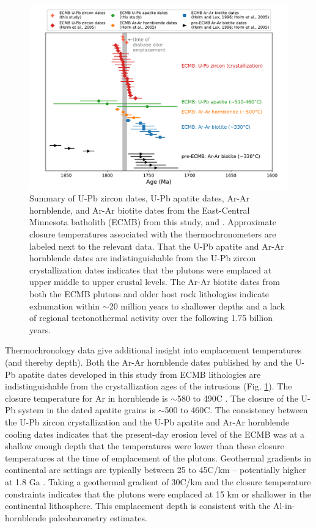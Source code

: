 \documentclass[draft]{agujournal2019}
\begin{document}
\begin{figure}[!ht]
\centering
\noindent\includegraphics[width=\textwidth]{./figures/ECMB_dates_thermochron.pdf}
\caption{\small{Summary of U-Pb zircon dates, U-Pb apatite dates, Ar-Ar hornblende, and Ar-Ar biotite dates from the East-Central Minnesota batholith (ECMB) from this study,  and . Approximate closure temperatures associated with the thermochronometers are labeled next to the relevant data. That the U-Pb apatite and Ar-Ar hornblende dates are indistinguishable from the U-Pb zircon crystallization dates indicates that the plutons were emplaced at upper middle to upper crustal levels. The Ar-Ar biotite dates from both the ECMB plutons and older host rock lithologies indicate exhumation within $\sim$20 million years to shallower depths and a lack of regional tectonothermal activity over the following 1.75 billion years.}}
\label{fig:thermochron_dates}
\end{figure}

Thermochronology data give additional insight into emplacement temperatures (and thereby depth). Both the Ar-Ar hornblende dates published by  and the U-Pb apatite dates developed in this study from ECMB lithologies are indistinguishable from the crystallization ages of the intrusions (Fig. \ref{fig:thermochron_dates}). The closure temperature for Ar in hornblende is $\sim$580 to 490\textdegree C \cite{Harrison1982a}. The closure of the U-Pb system in the dated apatite grains is $\sim$500 to 460\textdegree C. The consistency between the U-Pb zircon crystallization and the U-Pb apatite and Ar-Ar hornblende cooling dates indicates that the present-day erosion level of the ECMB was at a shallow enough depth that the temperatures were lower than these closure temperatures at the time of emplacement of the plutons. Geothermal gradients in continental arc settings are typically between 25 to 45\textdegree C/km -- potentially higher at 1.8 Ga \cite{Rothstein2003a}. Taking a geothermal gradient of 30\textdegree C/km and the closure temperature constraints indicates that the plutons were emplaced at 15 km or shallower in the continental lithosphere. This emplacement depth is consistent with the Al-in-hornblende paleobarometry estimates. 
\end{document}
